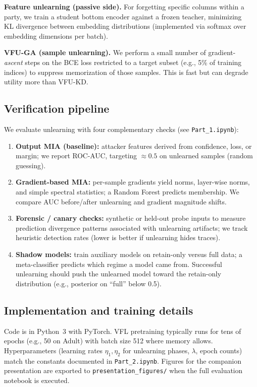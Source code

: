 \documentclass[sigconf,screen]{acmart}
\begin{document}
\textbf{Feature unlearning (passive side).} For forgetting specific columns within a party, we train a student bottom encoder against a frozen teacher, minimizing KL divergence between embedding distributions (implemented via softmax over embedding dimensions per batch).

\textbf{\textsc{VFU-GA} (sample unlearning).} We perform a small number of gradient-\emph{ascent} steps on the BCE loss restricted to a target subset (e.g., 5\% of training indices) to suppress memorization of those samples. This is fast but can degrade utility more than \textsc{VFU-KD}.

\subsection{Verification pipeline}
We evaluate unlearning with four complementary checks (see \texttt{Part\_1.ipynb}):
\begin{enumerate}
  \item \textbf{Output MIA (baseline):} attacker features derived from confidence, loss, or margin; we report ROC-AUC, targeting $\approx 0.5$ on unlearned samples (random guessing).
  \item \textbf{Gradient-based MIA:} per-sample gradients yield norms, layer-wise norms, and simple spectral statistics; a Random Forest predicts membership. We compare AUC before/after unlearning and gradient magnitude shifts.
  \item \textbf{Forensic / canary checks:} synthetic or held-out probe inputs to measure prediction divergence patterns associated with unlearning artifacts; we track heuristic detection rates (lower is better if unlearning hides traces).
  \item \textbf{Shadow models:} train auxiliary models on retain-only versus full data; a meta-classifier predicts which regime a model came from. Successful unlearning should push the unlearned model toward the retain-only distribution (e.g., posterior on ``full'' below 0.5).
\end{enumerate}

\subsection{Implementation and training details}
Code is in Python~3 with PyTorch. VFL pretraining typically runs for tens of epochs (e.g., 50 on Adult) with batch size 512 where memory allows. Hyperparameters (learning rates $\eta_1,\eta_2$ for unlearning phases, $\lambda$, epoch counts) match the constants documented in \texttt{Part\_2.ipynb}. Figures for the companion presentation are exported to \texttt{presentation\_figures/} when the full evaluation notebook is executed.
\end{document}
